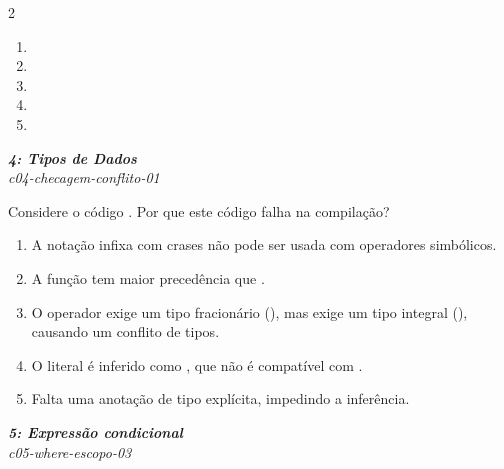 \documentclass[a4paper,10pt,brazil]{article}
\begin{document}
\begin{multicols}{2}
\begin{enumerate}
  \item {}

  \item {}

  \item {}

  \item {}

  \item {}


\end{enumerate}

\begin{flushright}
  \footnotesize
  \textit{\textbf{4: Tipos de Dados}}\\
  \textit{c04-checagem-conflito-01}\\

\end{flushright}
Considere o código . Por que este código falha na compilação?

\begin{enumerate}
  \item A notação infixa com crases não pode ser usada com operadores simbólicos.

  \item A função  tem maior precedência que \haskellinline{/}.

  \item O operador \haskellinline{/} exige um tipo fracionário (), mas  exige um tipo integral (), causando um conflito de tipos.

  \item O literal  é inferido como , que não é compatível com .

  \item Falta uma anotação de tipo explícita, impedindo a inferência.


\end{enumerate}

\begin{flushright}
  \footnotesize
  \textit{\textbf{5: Expressão condicional}}\\
  \textit{c05-where-escopo-03}\\


\end{flushright}
\end{multicols}
\end{document}
